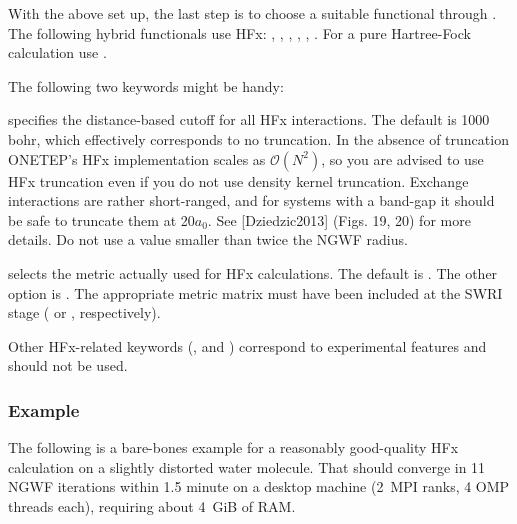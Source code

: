 \documentclass[letterpaper,10pt,english]{sphinxmanual}
\begin{document}
With the above set up, the last step is to choose a suitable functional
through . The following hybrid functionals use HFx:
, , , , , . For a
pure Hartree-Fock calculation use .

\begin{DUlineblock}{0em}
\item[] The following two keywords might be handy:
\item[]  \textendash{} specifies the distance-based cutoff for
all HFx interactions. The default is 1000 bohr, which effectively
corresponds to no truncation. In the absence of truncation ONETEP’s
HFx implementation scales as \({\mathcal{O}}(N^2)\), so you are
advised to use HFx truncation even if you do not use density kernel
truncation. Exchange interactions are rather short-ranged, and for
systems with a band-gap it should be safe to truncate them at
20\(a_0\). See {[}Dziedzic2013{]} (Figs. 19, 20) for more
details. Do not use a value smaller than twice the NGWF radius.
\end{DUlineblock}

 \textendash{} selects the metric actually used for HFx
calculations. The default is . The other option is
. The appropriate metric matrix must have been included at
the SWRI stage ( or , respectively).

Other HFx-related keywords (,
 and ) correspond to
experimental features and should not be used.


\subsubsection{Example}
\label{\detokenize{hfx:example}}
The following is a bare-bones example for a reasonably good-quality HFx
calculation on a slightly distorted water molecule. That should converge
in 11 NGWF iterations within 1.5 minute on a desktop machine (2 MPI
ranks, 4 OMP threads each), requiring about 4 GiB of RAM.
\end{document}

